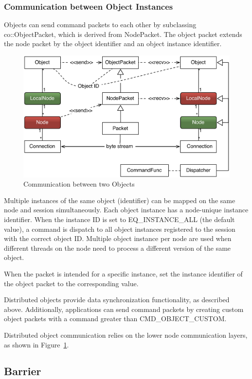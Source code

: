 \documentclass[10pt,a4]{scrartcl}
\newcommand{\fig}[1]{Figure~\ref{#1}}
\begin{document}
\subsubsection{Communication between Object Instances}

Objects can send command packets to each other by subclassing
\textsf{co::Ob\-ject\-Packet}, which is derived from \textsf{NodePacket}. The
object packet extends the node packet by the object identifier and an object
instance identifier.

\begin{figure}
  \includegraphics[width=.618\textwidth]{images/netObject.pdf}
  {\caption{\label{fNetObject}Communication between two Objects}}
\end{figure}
Multiple instances of the same object (identifier) can be mapped on the same
node and session simultaneously. Each object instance has a node-unique instance
identifier. When the instance ID is set to \textsf{EQ\_INSTANCE\_ALL} (the
default value), a command is dispatch to all object instances registered to the
session with the correct object ID. Multiple object instance per node are used
when different threads on the node need to process a different version of the
same object.

When the packet is intended for a specific instance, set the instance identifier
of the object packet to the corresponding value.

Distributed objects provide data synchronization functionality, as described
above. Additionally, applications can send command packets by creating custom
object packets with a command greater than \textsf{CMD\_OBJECT\_CUSTOM}.

Distributed object communication relies on the lower node communication layers,
as shown in \fig{fNetObject}.

\subsection{Barrier}
\end{document}

